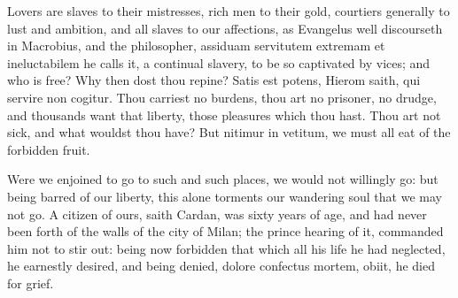 {Lovers are slaves to their mistresses, rich men to their gold,
courtiers generally to lust and ambition, and all slaves to our
affections, as Evangelus well discourseth in Macrobius, and
\Seneca the philosopher, assiduam servitutem extremam et
ineluctabilem he calls it, a continual slavery, to be so captivated by
vices; and who is free? Why then dost thou repine? Satis est potens,
Hierom saith, qui servire non cogitur. Thou carriest no burdens, thou
art no prisoner, no drudge, and thousands want that liberty, those
pleasures which thou hast. Thou art not sick, and what wouldst thou
have? But nitimur in vetitum, we must all eat of the forbidden fruit.

Were we enjoined to go to such and such places, we would not willingly
go: but being barred of our liberty, this alone torments our wandering
soul that we may not go. A citizen of ours, saith Cardan, was
sixty years of age, and had never been forth of the walls of the city
of Milan; the prince hearing of it, commanded him not to stir out:
being now forbidden that which all his life he had neglected, he
earnestly desired, and being denied, dolore confectus mortem, obiit, he
died for grief.

}
